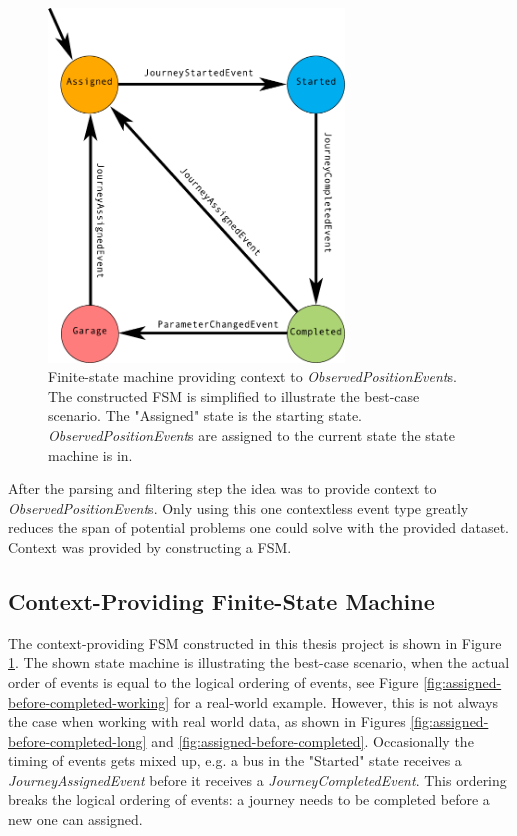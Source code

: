 \begin{figure}[ht!]
    \centering
    \includegraphics[width=0.7\textwidth]{figures/context-state-machine}
    \caption{Finite-state machine providing context to \textit{ObservedPositionEvent}s. 
    The constructed FSM is simplified to illustrate the best-case scenario.
    The "Assigned" state is the starting state.
    \textit{ObservedPositionEvent}s are assigned to the current state the state machine is in.
    }
    \label{fig:context-state-machine}
\end{figure}

After the parsing and filtering step the idea was to provide context to \textit{ObservedPositionEvent}s.
Only using this one contextless event type greatly reduces the span of potential problems one could solve with the provided dataset.
Context was provided by constructing a FSM.

\subsection{Context-Providing Finite-State Machine}
The context-providing FSM constructed in this thesis project is shown in Figure \ref{fig:context-state-machine}.
The shown state machine is illustrating the best-case scenario, when the actual order of events is equal to the logical ordering of events, see Figure \ref{fig:assigned-before-completed-working} for a real-world example.
However, this is not always the case when working with real world data, as shown in Figures \ref{fig:assigned-before-completed-long} and \ref{fig:assigned-before-completed}.
Occasionally the timing of events gets mixed up, e.g. a bus in the "Started" state receives a \textit{JourneyAssignedEvent} before it receives a \textit{JourneyCompletedEvent}.
This ordering breaks the logical ordering of events: a journey needs to be completed before a new one can assigned.

